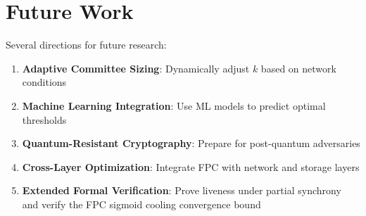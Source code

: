 \section{Future Work}

\label{sec:future}

Several directions for future research:

\begin{enumerate}
\item \textbf{Adaptive Committee Sizing}: Dynamically adjust $k$ based on network conditions
\item \textbf{Machine Learning Integration}: Use ML models to predict optimal thresholds
\item \textbf{Quantum-Resistant Cryptography}: Prepare for post-quantum adversaries
\item \textbf{Cross-Layer Optimization}: Integrate FPC with network and storage layers
\item \textbf{Extended Formal Verification}: Prove liveness under partial synchrony and verify the FPC sigmoid cooling convergence bound
\end{enumerate}

